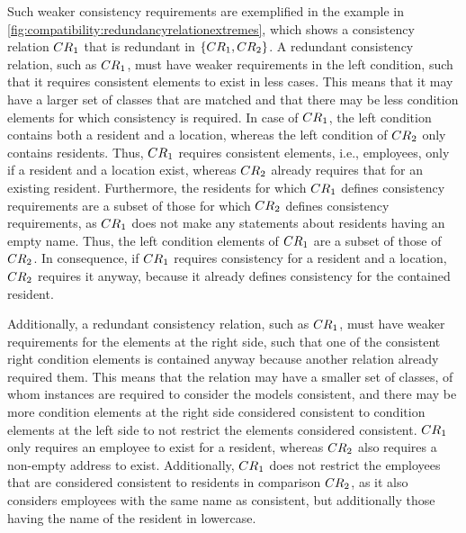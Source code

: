 \begin{example}
Such weaker consistency requirements are exemplified in the example in \autoref{fig:compatibility:redundancyrelationextremes}, which shows a consistency relation $\consistencyrelation{CR}{1}$ that is redundant in $\setted{\consistencyrelation{CR}{1}, \consistencyrelation{CR}{2}}$.
A redundant consistency relation, such as $\consistencyrelation{CR}{1}$, must have weaker requirements in the left condition, such that it requires consistent elements to exist in less cases.
This means that it may have a larger set of classes that are matched and that there may be less condition elements for which consistency is required.
In case of $\consistencyrelation{CR}{1}$, the left condition contains both a resident and a location, whereas the left condition of $\consistencyrelation{CR}{2}$ only contains residents.
Thus, $\consistencyrelation{CR}{1}$ requires consistent elements, i.e., employees, only if a resident and a location exist, whereas $\consistencyrelation{CR}{2}$ already requires that for an existing resident.
Furthermore, the residents for which $\consistencyrelation{CR}{1}$ defines consistency requirements are a subset of those for which $\consistencyrelation{CR}{2}$ defines consistency requirements, as $\consistencyrelation{CR}{1}$ does not make any statements about residents having an empty name.
Thus, the left condition elements of $\consistencyrelation{CR}{1}$ are a subset of those of $\consistencyrelation{CR}{2}$.
In consequence, if $\consistencyrelation{CR}{1}$ requires consistency for a resident and a location, $\consistencyrelation{CR}{2}$ requires it anyway, because it already defines consistency for the contained resident.

Additionally, a redundant consistency relation, such as $\consistencyrelation{CR}{1}$, must have weaker requirements for the  elements at the right side, such that one of the consistent right condition elements is contained anyway because another relation already required them. 
This means that the relation may have a smaller set of classes, of whom instances are required to consider the models consistent, and there may be more condition elements at the right side considered consistent to condition elements at the left side to not restrict the elements considered consistent.
$\consistencyrelation{CR}{1}$ only requires an employee to exist for a resident, whereas $\consistencyrelation{CR}{2}$ also requires a non-empty address to exist. Additionally, $\consistencyrelation{CR}{1}$ does not restrict the employees that are considered consistent to residents in comparison $\consistencyrelation{CR}{2}$, as it also considers employees with the same name as consistent, but additionally those having the name of the resident in lowercase.
\end{example}

